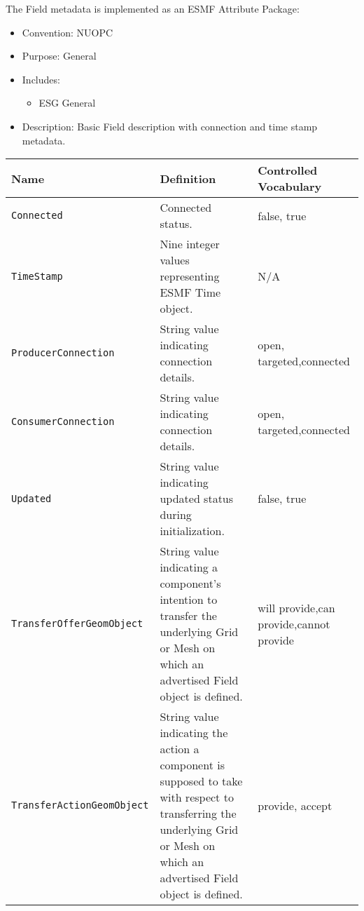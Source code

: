 \label{FieldMeta}
The Field metadata is implemented as an ESMF Attribute Package:

\begin{itemize}
    \item Convention: NUOPC
    \item Purpose: General
    \item Includes:
    \begin{itemize}
        \item ESG General
    \end{itemize} 
    \item Description: Basic Field description with connection and time stamp metadata. 
\end{itemize}

\begin{tabular}{|p{5cm}|p{5cm}|p{35mm}|}
     \hline\hline
     {\bf Name} & {\bf Definition} & {\bf Controlled Vocabulary}\\
     \hline\hline
     {\tt Connected} & Connected status.& false, true\\ \hline
     {\tt TimeStamp} & Nine integer values representing ESMF Time object.& N/A\\ \hline
     {\tt ProducerConnection} & String value indicating connection details.& open, targeted,\newline connected\\ \hline
     {\tt ConsumerConnection} & String value indicating connection details.& open, targeted,\newline connected\\ \hline
     {\tt Updated} & String value indicating updated status during initialization.& false, true\\ \hline
     {\tt TransferOfferGeomObject} & String value indicating a component's intention to transfer the underlying Grid or Mesh on which an advertised Field object is defined.& will provide,\newline can provide,\newline cannot provide\\ \hline
     {\tt TransferActionGeomObject} & String value indicating the action a component is supposed to take with respect to transferring the underlying Grid or Mesh on which an advertised Field object is defined.& provide, accept\\ \hline
     \hline
\end{tabular}
